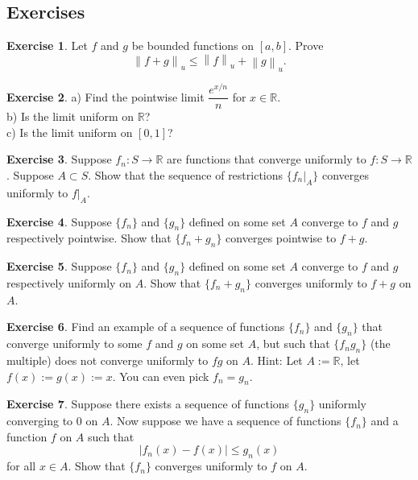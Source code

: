 \documentclass[12pt]{book}
\newcommand{\abs}[1]{\left\lvert {#1} \right\rvert}
\newcommand{\norm}[1]{\left\lVert {#1} \right\rVert}
\newcommand{\R}{{\mathbb{R}}}
\theoremstyle{plain}
\theoremstyle{remark}
\theoremstyle{definition}
\theoremstyle{exercise}
\newtheorem{exercise}{Exercise}[section]
\theoremstyle{example}
\begin{document}
\subsection{Exercises}

\begin{exercise}
Let $f$ and $g$ be bounded functions on $[a,b]$.  Prove 
\begin{equation*}
\norm{f+g}_u \leq \norm{f}_u + \norm{g}_u .
\end{equation*}
\end{exercise}


\begin{exercise}
a) Find the pointwise limit $\dfrac{e^{x/n}}{n}$ for $x \in \R$. \nopagebreak
\\
b) Is the limit uniform on $\R$?
\\
c) Is the limit uniform on $[0,1]$?
\end{exercise}

\begin{exercise}
Suppose $f_n \colon S \to \R$ are functions that converge uniformly
to $f \colon S \to \R$.  Suppose $A \subset S$.  Show that
the sequence of restrictions $\{ f_n|_A \}$ converges uniformly to $f|_A$.
\end{exercise}

\begin{exercise}
Suppose $\{ f_n \}$ and $\{ g_n \}$ defined on some set $A$ converge to
$f$ and $g$ respectively pointwise.  Show that $\{ f_n+g_n \}$ converges
pointwise to $f+g$.
\end{exercise}

\begin{exercise}
Suppose $\{ f_n \}$ and $\{ g_n \}$ defined on some set $A$ converge to
$f$ and $g$ respectively uniformly on $A$.  Show that $\{ f_n+g_n \}$
converges uniformly to $f+g$ on $A$.
\end{exercise}

\begin{exercise}
Find an example of a sequence of functions $\{ f_n \}$ and $\{ g_n \}$
that converge uniformly to some $f$ and $g$ on some set $A$, but such that
$\{ f_ng_n \}$ (the multiple) does not converge uniformly to $fg$ on $A$.
Hint: Let $A := \R$, let $f(x):=g(x) := x$.  You can even pick $f_n = g_n$.
\end{exercise}

\begin{exercise}
Suppose there exists a sequence of functions $\{ g_n \}$ uniformly
converging to $0$ on $A$.  Now suppose we have a sequence of functions
$\{ f_n \}$ and a function $f$ on $A$ such that
\begin{equation*}
\abs{f_n(x) - f(x)} \leq g_n(x) 
\end{equation*}
for all $x \in A$.  Show that $\{ f_n \}$ converges uniformly to $f$ on $A$.
\end{exercise}
\end{document}
